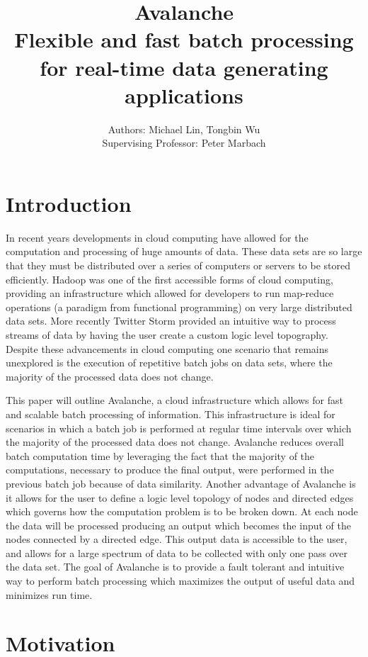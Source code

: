 \documentclass[a4paper]{article}
\title{\LARGE Avalanche \\
        \large Flexible and fast batch processing for real-time data generating applications}
\author{Authors: Michael Lin, Tongbin Wu \\
		Supervising Professor: Peter Marbach}
\begin{document}
\maketitle

\clearpage
\tableofcontents
\clearpage

\section{Introduction}
In recent years developments in cloud computing have allowed for the computation and processing of huge amounts of data.  These data sets are so large that they must be distributed over a series of computers or servers to be stored efficiently.  Hadoop was one of the first accessible forms of cloud computing, providing an infrastructure which allowed for developers to run map-reduce operations (a paradigm from functional programming) on very large distributed data sets.  More recently Twitter Storm provided an intuitive way to process streams of data by having the user create a custom logic level topography. Despite these advancements in cloud computing one scenario that remains unexplored is the execution of repetitive batch jobs on data sets, where the majority of the processed data does not change.  

This paper will outline Avalanche, a cloud infrastructure which allows for fast and scalable batch processing of information.  This infrastructure is ideal for scenarios in which a batch job is performed at regular time intervals over which the majority of the processed data does not change. Avalanche reduces overall batch computation time by leveraging the fact that the majority of the computations, necessary to produce the final output, were performed in the previous batch job because of data similarity.  Another advantage of Avalanche is it allows for the user to define a logic level topology of nodes and directed edges which governs how the computation problem is to be broken down.  At each node the data will be processed producing an output which becomes the input of the nodes connected by a directed edge.  This output data is accessible to the user, and allows for a large spectrum of data to be collected with only one pass over the data set.  The goal of Avalanche is to provide a fault tolerant and intuitive way to perform batch processing which maximizes the output of useful data and minimizes run time.   

\section{Motivation}
\end{document}
